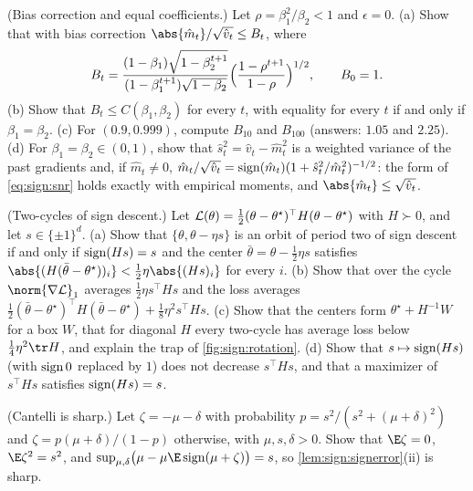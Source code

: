 \begin{refsection}
\begin{exercises}
\item \consolidation (Bias correction and equal coefficients.)\label{ex:sign:biascorr} Let $\rho=\beta_1^2/\beta_2<1$ and $\epsilon=0$. (a) Show that with bias correction $\abs{\hat m_t}/\sqrt{\hat v_t}\le B_t$, where
\[
  B_t=\frac{(1-\beta_1)\sqrt{1-\beta_2^{t+1}}}{(1-\beta_1^{t+1})\sqrt{1-\beta_2}}\Bigl(\frac{1-\rho^{t+1}}{1-\rho}\Bigr)^{1/2},\qquad B_0=1 .
\]
(b) Show that $B_t\le C(\beta_1,\beta_2)$ for every $t$, with equality for every $t$ if and only if $\beta_1=\beta_2$. (c) For $(0.9,0.999)$, compute $B_{10}$ and $B_{100}$ (answers: $1.05$ and $2.25$). (d) For $\beta_1=\beta_2\in(0,1)$, show that $\hat s_t^2=\hat v_t-\hat m_t^2$ is a weighted variance of the past gradients and, if $\hat m_t\ne0$, $\hat m_t/\sqrt{\hat v_t}=\operatorname{sign}(\hat m_t)(1+\hat s_t^2/\hat m_t^2)^{-1/2}$: the form of \eqref{eq:sign:snr} holds exactly with empirical moments, and $\abs{\hat m_t}\le\sqrt{\hat v_t}$. 

\item \consolidation\hard (Two-cycles of sign descent.)\label{ex:sign:cycles} Let $\mathcal{L}(\theta)=\frac12(\theta-\theta^\star)^\top H(\theta-\theta^\star)$ with $H\succ0$, and let $s\in\{\pm1\}^d$. (a) Show that $\{\theta,\theta-\eta s\}$ is an orbit of period two of sign descent if and only if $\operatorname{sign}(Hs)=s$ and the center $\bar\theta=\theta-\frac12\eta s$ satisfies $\abs{(H(\bar\theta-\theta^\star))_i}<\frac12\eta\abs{(Hs)_i}$ for every $i$. (b) Show that over the cycle $\norm{\nabla\Loss}_1$ averages $\frac12\eta s^\top Hs$ and the loss averages $\frac12(\bar\theta-\theta^\star)^\top H(\bar\theta-\theta^\star)+\frac18\eta^2s^\top Hs$. (c) Show that the centers form $\theta^\star+H^{-1}W$ for a box $W$, that for diagonal $H$ every two-cycle has average loss below $\frac14\eta^2\tr H$, and explain the trap of \cref{fig:sign:rotation}. (d) Show that $s\mapsto\operatorname{sign}(Hs)$ (with $\operatorname{sign}0$ replaced by $1$) does not decrease $s^\top Hs$, and that a maximizer of $s^\top Hs$ satisfies $\operatorname{sign}(Hs)=s$. 

\item \consolidation (Cantelli is sharp.) Let $\zeta=-\mu-\delta$ with probability $p=s^2/(s^2+(\mu+\delta)^2)$ and $\zeta=p(\mu+\delta)/(1-p)$ otherwise, with $\mu,s,\delta>0$. Show that $\E\zeta=0$, $\E\zeta^2=s^2$, and $\sup_{\mu,\delta}\bigl(\mu-\mu\E\sign(\mu+\zeta)\bigr)=s$, so \cref{lem:sign:signerror}(ii) is sharp.


\end{exercises}
\end{refsection}
